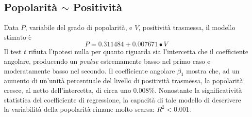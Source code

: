\documentclass[fleqn,10pt]{SelfArx} %
\begin{document}
\subsection*{Popolarità $\sim$ Positività}
Data $P$, variabile del grado di popolarità, e $V$, positività trasmessa, il modello stimato è
\begin{equation}
    P=0.311484+0.007671\bullet V
\end{equation}
Il test $t$ rifiuta l'ipotesi nulla per quanto riguarda sia l'intercetta che il coefficiente angolare, producendo un \textit{pvalue} estremamente basso nel primo caso e moderatamente basso nel secondo. Il coefficiente angolare $\beta_1$ mostra che, ad un aumento di un'unità percentuale del livello di positività trasmessa, la popolarità cresce, al netto dell'intercetta, di circa uno 0.008\%. Nonostante la significatività statistica del coefficiente di regressione, la capacità di tale modello di descrivere la variabilità della popolarità rimane molto scarsa: $R^2<0.001$.
\end{document}
